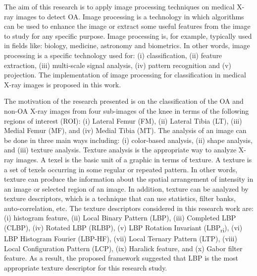 \documentclass[review]{elsarticle}
\begin{document}
The aim of this research is to apply image processing techniques on medical X-ray images to detect OA. Image processing is a technology in which algorithms can be used to enhance the image or extract some useful features from the image to study for any specific purpose. Image processing is, for example, typically used in fields like: biology, medicine, astronomy and biometrics. In other words, image processing is a specific technology used for: (i) classification, (ii) feature extraction, (iii) multi-scale signal analysis, (iv) pattern recognition and (v) projection. The implementation of image processing for classification in medical X-ray images is proposed in this work. 

The motivation of the research presented is on the classification of the OA and non-OA X-ray images from four sub-images of the knee in terms of the following regions of interest (ROI): (i) Lateral Femur (FM), (ii) Lateral Tibia (LT), (iii) Medial Femur (MF), and (iv) Medial Tibia (MT). The analysis of an image can be done in three main ways including: (i) color-based analysis, (ii) shape analysis, and (iii) texture analysis. Texture analysis is the appropriate way to analyze X-ray images. A texel is the basic unit of a graphic in terms of texture. A texture is a set of texels occurring in some regular or repeated pattern. In other words, texture can produce the information about the spatial arrangement of intensity in an image or selected region of an image. In addition, texture can be analyzed by texture descriptors, which is a technique that can use statistics, filter banks, auto-correlation, etc. The texture descriptors considered in this research work are: (i) histogram feature, (ii) Local Binary Pattern (LBP), (iii) Completed LBP (CLBP), (iv) Rotated LBP (RLBP), (v) LBP Rotation Invariant (LBP\textsubscript{ri}), (vi) LBP Histogram Fourier (LBP-HF), (vii) Local Ternary Pattern (LTP), (viii) Local Configuration Pattern (LCP), (ix) Haralick feature, and (x) Gabor filter feature. As a result, the proposed framework suggested that LBP is the most appropriate texture descriptor for this research study. 

\end{document}
